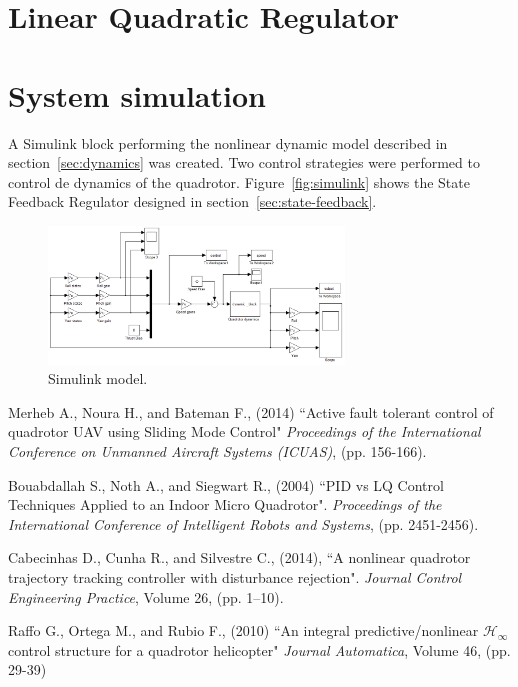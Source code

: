 \documentclass[12pt]{article}
\begin{document}
\section{Linear Quadratic Regulator}

\section{System simulation}
A Simulink block performing the nonlinear dynamic model described in section~\ref{sec:dynamics} was created. Two control strategies were performed to control de dynamics of the quadrotor. Figure~\ref{fig:simulink} shows the State Feedback Regulator designed in section~\ref{sec:state-feedback}.

\begin{figure}[b]
  \centering
  \includegraphics[width=0.7\textwidth]{Simulink.png}
  \caption{Simulink model.}
  \label{fig:model}
\end{figure}
 
\begin{thebibliography}{100} %
 Merheb A., Noura H., and Bateman F., (2014)
``Active fault tolerant control of quadrotor UAV using Sliding Mode Control"
\emph{Proceedings of the International Conference on Unmanned Aircraft Systems (ICUAS)},
(pp. 156-166).

 Bouabdallah S., Noth A., and Siegwart R., (2004) 
``PID vs LQ Control Techniques Applied to an Indoor Micro Quadrotor". 
\emph{Proceedings of the International Conference of Intelligent Robots and Systems}, 
(pp. 2451-2456).

 Cabecinhas D., Cunha R., and Silvestre C., (2014),
``A nonlinear quadrotor trajectory tracking controller with disturbance rejection".
\emph{Journal Control Engineering Practice}, Volume 26, (pp. 1–10).

 Raffo G., Ortega M., and Rubio F., (2010)
``An integral predictive/nonlinear $\mathcal{H} _\infty$ control structure for a quadrotor helicopter"
\emph{Journal Automatica}, Volume 46, (pp. 29-39)
\end{thebibliography}
\end{document}

